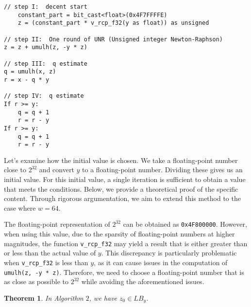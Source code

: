 \documentclass[12pt]{elsarticle}
\newtheorem{theorem}{Theorem}
\begin{document}
\begin{Verbatim}[frame=single, fontsize=\small, label={Algorithm 2: UNR recurrence method for W=32.}]
// step I:  decent start
    constant_part = bit_cast<float>(0x4F7FFFFE)
    z = (constant_part * v_rcp_f32(y as float)) as unsigned

// step II:  One round of UNR (Unsigned integer Newton-Raphson)
z = z + umulh(z, -y * z)

// step III:  q estimate
q = umulh(x, z)
r = x - q * y

// step IV:  q estimate
If r >= y:
    q = q + 1
    r = r - y
If r >= y:
    q = q + 1
    r = r - y
\end{Verbatim}

Let's examine how the initial value is chosen. We take a floating-point number close to $2^{32}$ and convert $y$ to a floating-point number. Dividing these gives us an initial value. For this initial value, a single iteration is sufficient to obtain a value that meets the conditions. Below, we provide a theoretical proof of the specific content. Through rigorous argumentation, we aim to extend this method to the case where $w=64$.

The floating-point representation of \(2^{32}\) can be obtained as \texttt{0x4F800000}. However, when using this value, due to the sparsity of floating-point numbers at higher magnitudes, the function \texttt{v\_rcp\_f32} may yield a result that is either greater than or less than the actual value of \( y \). This discrepancy is particularly problematic when \texttt{v\_rcp\_f32} is less than \( y \), as it can cause issues in the computation of \texttt{umulh(z, -y * z)}. Therefore, we need to choose a floating-point number that is as close as possible to \(2^{32}\) while avoiding the aforementioned issues.

\begin{theorem}\label{thm4}
    In Algorithm $2$, we have $z_0 \in LB_y$.
\end{theorem}
    
\end{document}
